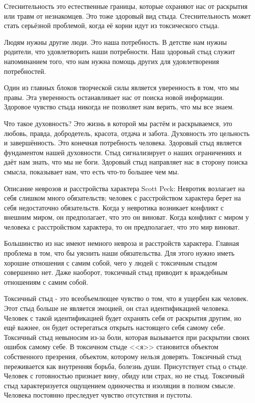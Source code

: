 \documentclass[10pt, fleqn]{article}
\begin{document}

Стеснительность это естественные границы, которые охраняют нас от раскрытия или травм от незнакомцев. Это тоже здоровый вид стыда.
Стеснительность может стать серьёзной проблемой, когда её корни идут из токсического стыда.


Людям нужны другие люди. Это наша потребность.
В детстве нам нужны родители, что удовлетворить наши потребности. Наш здоровый стыд служит напоминанием того, что нам нужна помощь других для удовлетворения потребностей.


Один из главных блоков творческой силы является уверенность в том, что мы правы. Эта уверенность останавливает нас от поиска новой информации.
Здоровое чувство стыда никогда не позволяет нам верить, что мы все знаем.


Что такое духовность? Это жизнь в которой мы растём и раскрываемся, это любовь, правда, добродетель, красота, отдача и забота.
Духовность это цельность и завершённость. Это конечная потребность человека.
Здоровый стыд является фундаментом нашей духовности. Стыд сигнализирует о наших ограничениях и даёт нам знать, что мы не боги. Здоровый стыд направляет нас в сторону поиска смысла, показывает нам, что есть что-то большее чем мы.


Описание неврозов и расстройства характера Scott Peck:
Невротик возлагает на себя слишком много обязательств; человек с расстройством характера берет на себя недостаточно обязательств. Когда у невротика возникает конфликт с внешним миром, он предполагает, что это он виноват. Когда конфликт с миром у человека с расстройством характера, то он предполагает, что это мир виноват.

Большинство из нас имеют немного невроза и расстройств характера. Главная проблема в том, что бы уяснить наши обязательства. Для этого нужно иметь хорошие отношения с самим собой, чего у людей с токсичным стыдом совершенно нет. Даже наоборот, токсичный стыд приводит к враждебным отношениям с самим собой.


Токсичный стыд - это всеобъемлющее чувство о том, что я ущербен как человек. Этот стыд больше не является эмоцией, он стал идентификацией человека.
Человек с такой идентификацией будет охранять себя от раскрытия другим, но ещё важнее, он будет остерегаться открыть настоящего себя самому себе.
Токсичный стыд невыносим из-за боли, которая вызывается при раскрытии своих ошибок самому себе.
В токсичном стыде <<я>> становится объектом собственного презрения, объектом, которому нельзя доверять.
Токсичный стыд переживается как внутренняя борьба, болезнь души.
Присутствует стыд о стыде. Человек с готовностью признает вину, обиду или страх, но не стыд. Токсичный стыд характеризуется ощущением одиночества и изоляции в полном смысле. Человека постоянно преследует чувство отсутствия и пустоты.
\end{document}
